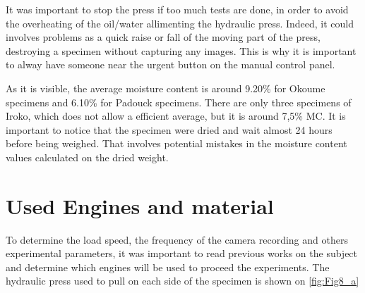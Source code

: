 It was important to stop the press if too much tests are done, in order to avoid the overheating of the oil/water allimenting the hydraulic press. Indeed, it could involves problems as a quick raise or fall of the moving part of the press, destroying a specimen without capturing any images. This is why it is important to alway have someone near the urgent button on the manual control panel.




As it is visible, the average moisture content is around 9.20\% for Okoume specimens and 6.10\% for Padouck specimens. There are only three specimens of Iroko, which does not allow a efficient average, but it is around 7,5\% MC. It is important to notice that the specimen were dried and wait almost 24 hours before being weighed. That involves potential mistakes in the moisture content values calculated on the dried weight.
\section{Used Engines and material}

To determine the load speed, the frequency of the camera recording and others experimental parameters, it was important to read previous works on the subject and determine which engines will be used to proceed the experiments. The hydraulic press used to pull on each side of the specimen is shown on \ref{fig:Fig8_a}

